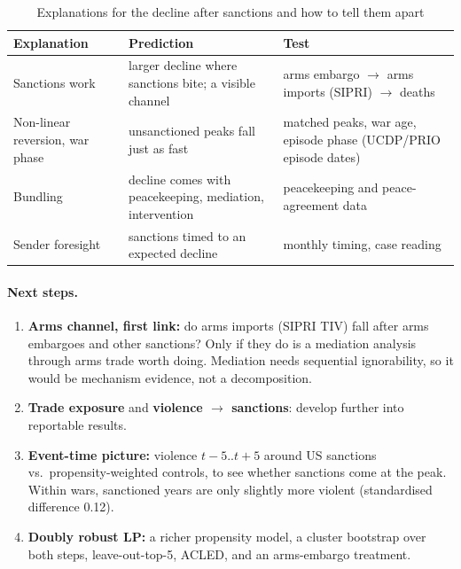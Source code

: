 \documentclass[11pt,a4paper]{article}
\begin{document}
\begin{table}[H]
\centering\small
\caption{Explanations for the decline after sanctions and how to tell them apart}
\label{tab:explanations}
\begin{tabularx}{\textwidth}{@{}p{3.4cm}XX@{}}
\toprule
Explanation & Prediction & Test \\
\midrule
Sanctions work & larger decline where sanctions bite; a visible channel & arms embargo $\rightarrow$ arms imports (SIPRI) $\rightarrow$ deaths \\
Non-linear reversion, war phase & unsanctioned peaks fall just as fast & matched peaks, war age, episode phase (UCDP/PRIO episode dates) \\
Bundling & decline comes with peacekeeping, mediation, intervention & peacekeeping and peace-agreement data \\
Sender foresight & sanctions timed to an expected decline & monthly timing, case reading \\
\bottomrule
\end{tabularx}
\end{table}

\paragraph{Next steps.}
\begin{enumerate}[leftmargin=*]
\item \textbf{Arms channel, first link:} do arms imports (SIPRI TIV) fall after arms embargoes and other sanctions?
  Only if they do is a mediation analysis through arms trade worth doing. Mediation needs sequential ignorability, so
  it would be mechanism evidence, not a decomposition.
\item \textbf{Trade exposure} and \textbf{violence $\rightarrow$ sanctions}: develop further into reportable results.
\item \textbf{Event-time picture:} violence $t-5..t+5$ around US sanctions vs.\ propensity-weighted controls, to see
  whether sanctions come at the peak. Within wars, sanctioned years are only slightly more violent (standardised
  difference 0.12).
\item \textbf{Doubly robust LP:} a richer propensity model, a cluster bootstrap over both steps, leave-out-top-5,
  ACLED, and an arms-embargo treatment.
\end{enumerate}



\end{document}
